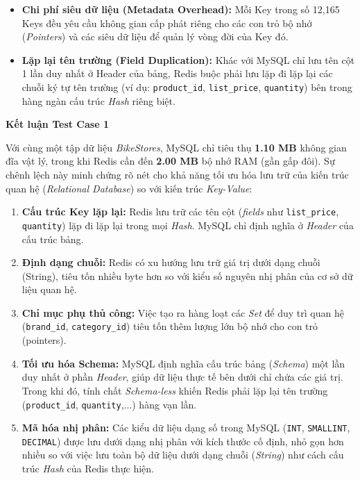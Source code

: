\begin{itemize}
    \item \textbf{Chi phí siêu dữ liệu (Metadata Overhead):} Mỗi Key trong số 12,165 Keys đều yêu cầu không gian cấp phát riêng cho các con trỏ bộ nhớ (\textit{Pointers}) và các siêu dữ liệu để quản lý vòng đời của Key đó.
    \item \textbf{Lặp lại tên trường (Field Duplication):} Khác với MySQL chỉ lưu tên cột 1 lần duy nhất ở Header của bảng, Redis buộc phải lưu lặp đi lặp lại các chuỗi ký tự tên trường (ví dụ: \texttt{product\_id}, \texttt{list\_price}, \texttt{quantity}) bên trong hàng ngàn cấu trúc \textit{Hash} riêng biệt.
\end{itemize}

\vspace{0.5em}

\noindent\textbf{Kết luận Test Case 1}

Với cùng một tập dữ liệu \textit{BikeStores}, MySQL chỉ tiêu thụ \textbf{1.10 MB} không gian đĩa vật lý, trong khi Redis cần đến \textbf{2.00 MB} bộ nhớ RAM (gần gấp đôi). Sự chênh lệch này minh chứng rõ nét cho khả năng tối ưu hóa lưu trữ của kiến trúc quan hệ (\textit{Relational Database}) so với kiến trúc \textit{Key-Value}:

\begin{enumerate}
    \item \textbf{Cấu trúc Key lặp lại:} Redis lưu trữ các tên cột (\textit{fields} như \texttt{list\_price}, \texttt{quantity}) lặp đi lặp lại trong mọi \textit{Hash}. MySQL chỉ định nghĩa ở \textit{Header} của cấu trúc bảng.
    \item \textbf{Định dạng chuỗi:} Redis có xu hướng lưu trữ giá trị dưới dạng chuỗi (String), tiêu tốn nhiều byte hơn so với kiểu số nguyên nhị phân của cơ sở dữ liệu quan hệ.
    \item \textbf{Chỉ mục phụ thủ công:} Việc tạo ra hàng loạt các \textit{Set} để duy trì quan hệ (\texttt{brand\_id}, \texttt{category\_id}) tiêu tốn thêm lượng lớn bộ nhớ cho con trỏ (pointers).
    \item \textbf{Tối ưu hóa Schema:} MySQL định nghĩa cấu trúc bảng (\textit{Schema}) một lần duy nhất ở phần \textit{Header}, giúp dữ liệu thực tế bên dưới chỉ chứa các giá trị. Trong khi đó, tính chất \textit{Schema-less} khiến Redis phải lặp lại tên trường (\texttt{product\_id}, \texttt{quantity},...) hàng vạn lần.
    \item \textbf{Mã hóa nhị phân:} Các kiểu dữ liệu dạng số trong MySQL (\texttt{INT}, \texttt{SMALLINT}, \texttt{DECIMAL}) được lưu dưới dạng nhị phân với kích thước cố định, nhỏ gọn hơn nhiều so với việc lưu toàn bộ dữ liệu dưới dạng chuỗi (\textit{String}) như cách cấu trúc \textit{Hash} của Redis thực hiện.
\end{enumerate}

